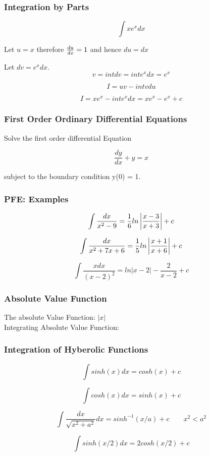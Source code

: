 \documentclass{beamer}
\begin{document}
			\begin{frame}
		\frametitle{Integration by Parts}
		\[ \int xe^xdx \]
		
		Let $u = x$  therefore ${du \over dx} =1$ and hence $du=dx$
		
		Let $dv = e^xdx$.
		\[ v= int dv = int e^x dx = e^x\]
		
		\[ I = uv - int vdu \]
		
		\[ I = xe^x -int e^x dx = xe^x - e^x + c \]
			\end{frame}
			\begin{frame}
		\frametitle{First Order Ordinary Differential Equations}
		
		Solve the first order differential Equation
		
		\[ \frac{dy}{dx} + y = x \]
		
		subject to the boundary condition y(0) = 1.
		
		
		
			\end{frame}
			\begin{frame}
		
		\frametitle{PFE: Examples}
		
		\[ \int \frac{dx}{x^2-9} = {1 \over 6}ln \left| \frac{x-3}{x+3} \right| + c \]
		
		\[ \int \frac{dx}{x^2 + 7x + 6} = {1 \over 5}ln \left| \frac{x+1}{x+6} \right| + c \]
		
		\[ \int \frac{x dx}{(x-2)^2} = ln \left| x-2 \right| - \frac{2}{x-2} + c \]
		
			\end{frame}
			\begin{frame}
		\frametitle{Absolute Value Function}
		The absolute Value Function: $|x|$\\
		Integrating Absolute Value Function:
		
		\end{frame}
		\begin{frame}
		\frametitle{Integration of Hyberolic Functions}
		
		\[ \int sinh(x) dx = cosh(x) + c\]
		
		\[ \int cosh(x) dx = sinh(x) + c\]
		
		\[ \int \frac{dx}{\sqrt{x^2+a^2}} dx = sinh^{-1}(x/a) + c \qquad x^2 < a^2\]
		
		\[ \int sinh(x/2) dx = 2cosh(x/2) + c\]
			\end{frame}
\end{document}
